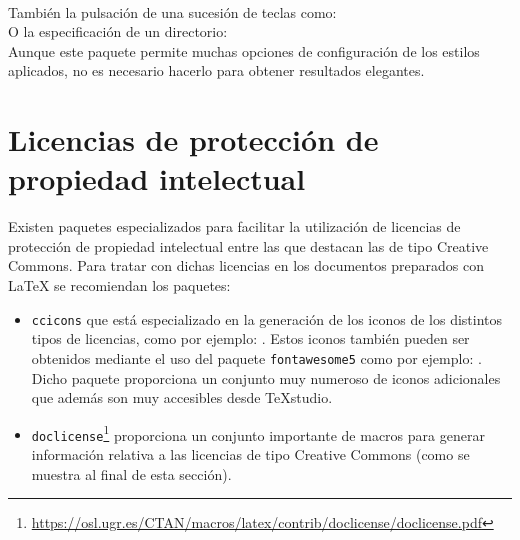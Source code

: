 \documentclass[11pt,a4paper]{article}
\begin{document}
\noindent {}\\

\noindent También la pulsación de una sucesión de teclas como:
\\

\noindent O la especificación de un directorio:
\\

\noindent Aunque este paquete permite muchas opciones de configuración de los estilos aplicados, no es necesario hacerlo para obtener resultados elegantes.



\section{Licencias de protección de propiedad intelectual}
Existen paquetes especializados para facilitar la utilización de licencias de protección de propiedad intelectual entre las que destacan las de tipo Creative Commons. Para tratar con dichas licencias en los documentos preparados con \LaTeX{} se recomiendan los paquetes:
\begin{itemize}
\item \texttt{ccicons} que está especializado en la generación de los iconos de los distintos tipos de licencias, como por ejemplo: \ccbyncsa. Estos iconos también pueden ser obtenidos mediante el uso del paquete \texttt{fontawesome5} como por ejemplo: \faCreativeCommons{} \faCreativeCommonsBy{} \faCreativeCommonsNcEu{} \faCreativeCommonsSa . Dicho paquete proporciona un conjunto muy numeroso de iconos adicionales que además son muy accesibles desde \TeX studio.

\item \texttt{doclicense}\footnote{\url{https://osl.ugr.es/CTAN/macros/latex/contrib/doclicense/doclicense.pdf}} proporciona un conjunto importante de macros para generar información relativa a las licencias de tipo Creative Commons (como se muestra al final de esta sección).
\end{itemize}

\doclicenseThis %
\end{document}
